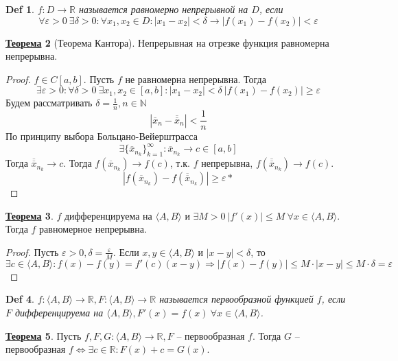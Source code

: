 \documentclass[12pt]{article}
\def\N{\mathbb{N}}       %
\def\R{\mathbb{R}}       %
\def\SO{\Rightarrow}     %
\def\EQ{\Leftrightarrow} %
\theoremstyle{definition} %
\newtheorem{Thm}{\underline{Теорема}}[subsection] %
\theoremstyle{plain} %
\newtheorem{Def}[Thm]{Def} %
\theoremstyle{remark} %
\begin{document}
\begin{Def}
    $f : D \to \R$ называется равномерно непрерывной на $D$, если 
    \[\forall \varepsilon > 0 \ \exists \delta > 0 : \forall x_1, x_2 \in D : |x_1 - x_2| < \delta \to |f(x_1) - f(x_2)| < \varepsilon\]
\end{Def}

\begin{Thm}[Теорема Кантора]
    Непрерывная на отрезке функция равномерна непрерывна.
\end{Thm}

\begin{proof}
    $f \in C[a, b]$. Пусть $f$ не равномерна непрерывна. Тогда
    \[\exists \varepsilon > 0 : \forall \delta > 0 \ \exists x_1, x_2 \in [a, b] : |x_1 - x_2| < \delta \ |f(x_1) - f(x_2)| \geqslant \varepsilon\]
    Будем рассматривать $\delta = \frac{1}{n}, n \in \N$ 
    \[|\overline{x}_n - \overline{\overline{x}}_n| < \frac{1}{n}\]
    По принципу выбора Больцано-Вейерштрасса
    \[\exists \{\overline{x}_{n_k}\}_{k = 1}^\infty : \overline{x}_{n_k} \to c \in [a, b]\]
    Тогда $\overline{\overline{x}}_{n_k} \to c$. Тогда $f(\overline{x}_{n_k}) \to f(c)$, т.к. $f$ непрерывна, $f(\overline{\overline{x}}_{n_k}) \to f(c)$.
    \[|f(\overline{x}_{n_k}) - f(\overline{\overline{x}}_{n_k})| \geqslant \varepsilon*\]  
\end{proof}

\begin{Thm}
    $f$ дифференцируема на $\langle A, B\rangle$ и $\exists M > 0 \ |f'(x)| \leqslant M \ \forall x \in \langle A, B\rangle$.
    Тогда $f$ равномерное непрерывна. 
\end{Thm}

\begin{proof}
    Пусть $\varepsilon > 0, \delta = \frac{\varepsilon}{M}$. Если $x, y \in \langle A, B\rangle$ и $|x - y| < \delta$, то
    \[\exists c \in \langle A, B\rangle : f(x) - f(y) = f'(c) (x - y) \SO |f(x) - f(y)| \leqslant M \cdot |x - y| \leqslant M \cdot \delta = \varepsilon\]
\end{proof}

\begin{Def}
    $f : \langle A, B\rangle \to \R, F : \langle A, B\rangle \to \R$ называется первообразной функцией $f$, если $F$ дифференцируема на $\langle A, B\rangle, F'(x) = f(x) \ \forall x \in \langle A, B\rangle$.
\end{Def}

\begin{Thm}
    Пусть $f, F, G : \langle A, B\rangle \to \R, F$ -- первообразная $f$. Тогда
    $G$ -- первообразная $f \EQ \exists c \in \R : F(x) + c = G(x)$.
\end{Thm}
\end{document}
